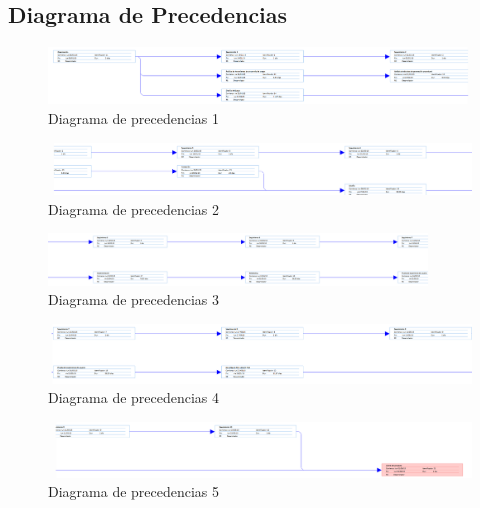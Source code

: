			\FloatBarrier

		\subsection{Diagrama de Precedencias}
			\begin{figure}[!htbp]
				\centering
				\includegraphics[scale=.4, angle=90]{fig/Red1}
				\caption{Diagrama de precedencias 1}
			\end{figure}

			\begin{figure}[!htbp]
				\centering
				\includegraphics[scale=.4, angle=90]{fig/Red2}
				\caption{Diagrama de precedencias 2}
			\end{figure}

			\begin{figure}[!htbp]
				\centering
				\includegraphics[scale=.4, angle=90]{fig/Red3}
				\caption{Diagrama de precedencias 3}
			\end{figure}

			\begin{figure}[!htbp]
				\centering
				\includegraphics[scale=.4, angle=90]{fig/Red4}
				\caption{Diagrama de precedencias 4}
			\end{figure}

			\begin{figure}[!htbp]
				\centering
				\includegraphics[scale=.4, angle=90]{fig/Red5}
				\caption{Diagrama de precedencias 5}
			\end{figure}


